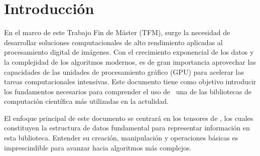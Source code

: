 \pagestyle{fancy}
\fancyhead[l]{\autorUO}
\fancyfoot[l]{\asignaturaAbbr}
\fancyfoot[r]{\fecha}

\section{Introducción} \label{sec:1}
En el marco de este Trabajo Fin de Máster (TFM), surge la necesidad de desarrollar soluciones computacionales de alto rendimiento aplicadas
al procesamiento digital de imágenes. Con el crecimiento exponencial de los datos y la complejidad de los algoritmos modernos, es de gran
importancia aprovechar las capacidades de las unidades de procesamiento gráfico (GPU) para acelerar las tareas computacionales intensivas.
Este documento tiene como objetivo introducir los fundamentos necesarios para comprender el uso de \pytorch\, una de las bibliotecas de
computación científica más utilizadas en la actulidad.

El enfoque principal de este documento se centrará en los tensores de \pytorch, los cuales constituyen la estructura de datos fundamental para
representar información en esta biblioteca. Entender su creación, manipulación y operaciones básicas es imprescindible para avanzar hacia
algoritmos más complejos.








